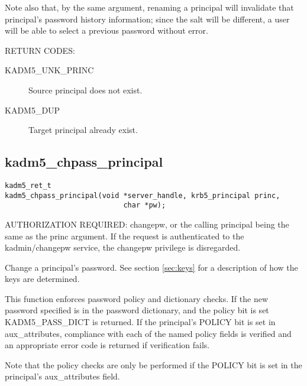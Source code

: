 Note also that, by the same argument, renaming a principal will
invalidate that principal's password history information; since the
salt will be different, a user will be able to select a previous
password without error.

RETURN CODES: 

\begin{description}
\item[KADM5_UNK_PRINC] Source principal does not exist.
\item[KADM5_DUP] Target principal already exist.
\end{description}

\subsection{kadm5_chpass_principal}

\begin{verbatim}
kadm5_ret_t
kadm5_chpass_principal(void *server_handle, krb5_principal princ,
                            char *pw);
\end{verbatim}

AUTHORIZATION REQUIRED: changepw, or the calling principal being the
same as the princ argument.  If the request is authenticated to the
kadmin/changepw service, the changepw privilege is disregarded.

Change a principal's password.   See section \ref{sec:keys} for a
description of how the keys are determined.

This function enforces password policy and dictionary checks.  If the new
password specified is in the password dictionary, and the policy bit is set
KADM5_PASS_DICT is returned.  If the principal's POLICY bit is set in
aux_attributes, compliance with each of the named policy fields is verified
and an appropriate error code is returned if verification fails.

Note that the policy checks are only be performed if the POLICY bit is
set in the principal's aux_attributes field.

